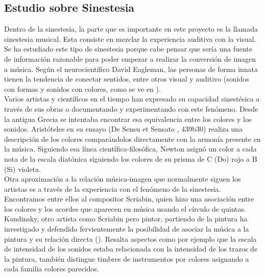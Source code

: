 \subsection{Estudio sobre Sinestesia}
\label{subsubsec:estudioSinestesia}



Dentro de la sinestesia, la parte que es importante en este proyecto es la llamada sinestesia musical. Esta consiste en mezclar la experiencia auditiva con la visual. Se ha estudiado este tipo de sinestesia porque cabe pensar que sería una fuente de información razonable para poder empezar a realizar la conversión de imagen a música.
Según el neurocientífico David Eagleman, las personas de forma innata tienen la tendencia de conectar sentidos, entre otros visual y auditivo (sonidos con formas y sonidos con colores, como se ve en \cite{VideoRedesFliparColores}).\\

Varios artistas y científicos en el tiempo han expresado su capacidad sinestésica a través de sus obras o documentando y experimentando con este fenómeno. Desde la antigua Grecia se intentaba encontrar esa equivalencia entre los colores y los sonidos. Aristóteles en su ensayo (De Sensu et Sensato \cite{DeSensuEtSensato}, 439b30) realiza una descripción de los colores comparándolos directamente con la armonía presente en la música. Siguiendo esa línea científica-filosófica, Newton asignó un color a cada nota de la escala diatónica siguiendo los colores de su prisma de C (Do) rojo a B (Si) violeta.\\

Otra aproximación a la relación música-imagen que normalmente siguen los artistas es a través de la experiencia con el fenómeno de la sinestesia. Encontramos entre ellos al compositor Scriabin, quien hizo una asociación entre los colores y los acordes que aparecen en música usando el círculo de quintas. Kandinsky, otro artista como Scriabin pero pintor, partiendo de la pintura ha investigado y defendido fervientemente la posibilidad de asociar la música a la pintura y su relación directa (\cite{ConcerningSpiritualArt}). Resalta aspectos como por ejemplo que la escala de intensidad de los sonidos estaba relacionada con la intensidad de los trazos de la pintura, también distingue timbres de instrumentos por colores asignando a cada familia colores parecidos.\\

